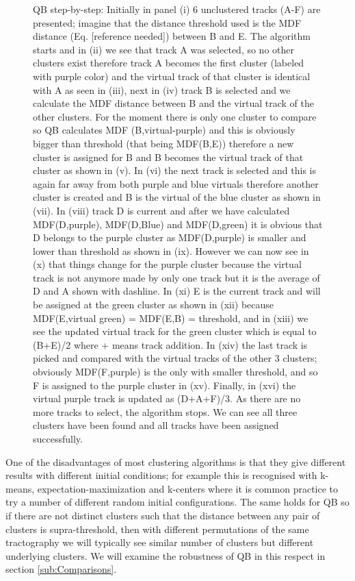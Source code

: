 \documentclass[preprint,authoryear,a4paper,10pt,onecolumn]{elsarticle}
\begin{document}
\begin{figure}
\label{Fig:LSC_simple}\caption{QB step-by-step: Initially in panel (i) 6 unclustered tracks (A-F)
are presented; imagine that the distance threshold used is the MDF
distance (Eq. [reference needed]) between B and E. The
algorithm starts and in (ii) we see that track A was selected, so
no other clusters exist therefore track A becomes the first cluster
(labeled with purple color) and the virtual track of that cluster
is identical with A as seen in (iii), next in (iv) track B is selected
and we calculate the MDF distance between B and the virtual track
of the other clusters. For the moment there is only one cluster to
compare so QB calculates MDF (B,virtual-purple) and this is obviously
bigger than threshold (that being MDF(B,E)) therefore a new cluster
is assigned for B and B becomes the virtual track of that cluster
as shown in (v). In (vi) the next track is selected and this is again
far away from both purple and blue virtuals therefore another cluster
is created and B is the virtual of the blue cluster as shown in (vii).
In (viii) track D is current and after we have calculated MDF(D,purple),
MDF(D,Blue) and MDF(D,green) it is obvious that D belongs to the purple
cluster as MDF(D,purple) is smaller and lower than threshold as shown
in (ix). However we can now see in (x) that things change for the
purple cluster because the virtual track is not anymore made by only
one track but it is the average of D and A shown with dashline. In
(xi) E is the current track and will be assigned at the green cluster
as shown in (xii) because MDF(E,virtual green) = MDF(E,B) = threshold,
and in (xiii) we see the updated virtual track for the green cluster
which is equal to (B+E)/2 where + means track addition. In (xiv) the
last track is picked and compared with the virtual tracks of the other
3 clusters; obviously MDF(F,purple) is the only with smaller threshold,
and so F is assigned to the purple cluster in (xv). Finally, in (xvi)
the virtual purple track is updated as (D+A+F)/3. As there are no
more tracks to select, the algorithm stops. We can see all three clusters
have been found and all tracks have been assigned successfully. }

\end{figure}

One of the disadvantages of most clustering algorithms is that they
give different results with different initial conditions; for example
this is recognised with k-means, expectation-maximization\cite{dempster1977maximum}
and k-centers\cite{gonzalez1985clustering} where it is common practice
to try a number of different random initial configurations. The same
holds for QB so if there are not distinct clusters such that the distance
between any pair of clusters is supra-threshold, then with different
permutations of the same tractography we will typically see similar
number of clusters but different underlying clusters. We will examine
the robustness of QB in this respect in section \ref{sub:Comparisons}.
\end{document}
